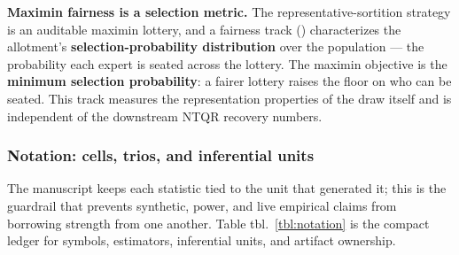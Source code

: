 \documentclass[
]{article}
\begin{document}
\textbf{Maximin fairness is a selection metric.} The
representative-sortition strategy is an auditable maximin lottery, and a
fairness track () characterizes
the allotment's \textbf{selection-probability distribution} over the
population --- the probability each expert is seated across the lottery.
The maximin objective is the \textbf{minimum selection probability}: a
fairer lottery raises the floor on who can be seated. This track
measures the representation properties of the draw itself and is
independent of the downstream NTQR recovery numbers.

\subsubsection{Notation: cells, trios, and inferential
units}\label{notation-cells-trios-and-inferential-units}

The manuscript keeps each statistic tied to the unit that generated it;
this is the guardrail that prevents synthetic, power, and live empirical
claims from borrowing strength from one another. Table
tbl.~\ref{tbl:notation} is the compact ledger for symbols, estimators,
inferential units, and artifact ownership.
\end{document}

